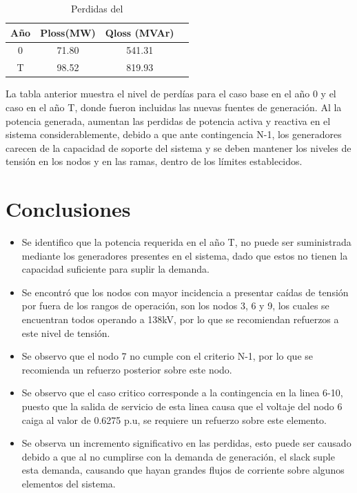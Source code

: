 \documentclass{article}
\begin{document}
\begin{table}[H]
\centering
\caption{Perdidas del }
\begin{tabular}{|c|c|c|c|}
\hline
Año & Ploss(MW) & Qloss (MVAr)  \\ \hline
0                       & 71.80                         & 541.31                         \\\hline
T                       & 98.52                         & 819.93                        \\\hline
\end{tabular}
\end{table}
La tabla anterior muestra el nivel de perdías para el caso base en el año 0  y el caso en el año T, donde fueron incluidas las nuevas fuentes de generación. Al la potencia generada, aumentan las perdidas de potencia activa y reactiva en el sistema considerablemente, debido a que ante contingencia N-1, los generadores carecen de la capacidad de soporte del sistema y se deben  mantener los niveles de tensión en los nodos y en las ramas, dentro de los límites establecidos.
\section{Conclusiones}

\begin{itemize}
    \item Se identifico que la potencia requerida en el año T, no puede ser suministrada mediante los generadores presentes en el sistema, dado que estos no tienen la capacidad suficiente para suplir la demanda.
    
    \item Se encontró que los nodos con mayor incidencia a presentar caídas de tensión por fuera de los rangos de operación, son los nodos 3, 6 y 9, los cuales se encuentran todos operando a 138kV, por lo que se recomiendan refuerzos a este nivel de tensión.
    
    \item Se observo que el nodo 7 no cumple con el criterio N-1, por lo que se recomienda un refuerzo posterior sobre este nodo.
    
    \item Se observo que el caso critico corresponde a la contingencia en la linea 6-10, puesto que la salida de servicio de esta linea causa que el voltaje del nodo 6 caiga al valor de 0.6275 p.u, se requiere un refuerzo sobre este elemento.
    
    \item Se observa un incremento significativo en las perdidas, esto puede ser causado debido a que al no cumplirse con la demanda de generación, el slack suple esta demanda, causando que hayan grandes flujos de corriente sobre algunos elementos del sistema.
\end{itemize}
\end{document}
